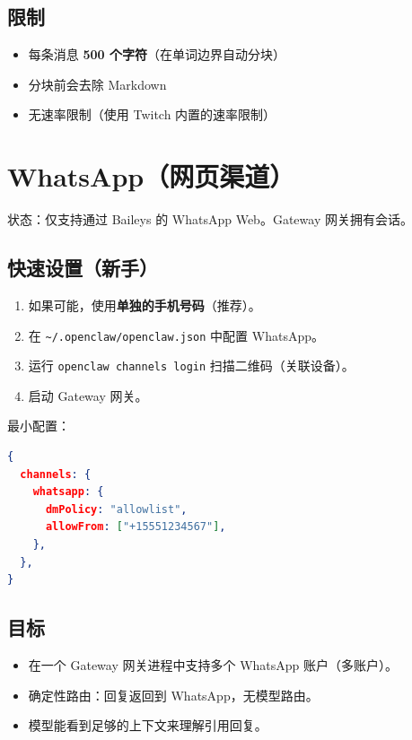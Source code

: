\subsection{限制}


\begin{itemize}
  \item 每条消息 \textbf{500 个字符}（在单词边界自动分块）
  \item 分块前会去除 Markdown
  \item 无速率限制（使用 Twitch 内置的速率限制）
\end{itemize}



\clearpage

\section{WhatsApp（网页渠道）}


状态：仅支持通过 Baileys 的 WhatsApp Web。Gateway 网关拥有会话。

\subsection{快速设置（新手）}


\begin{enumerate}
  \item 如果可能，使用\textbf{单独的手机号码}（推荐）。
  \item 在 \texttt{\textasciitilde{}/.openclaw/openclaw.json} 中配置 WhatsApp。
  \item 运行 \texttt{openclaw channels login} 扫描二维码（关联设备）。
  \item 启动 Gateway 网关。
\end{enumerate}


最小配置：

\begin{lstlisting}[language=json]
{
  channels: {
    whatsapp: {
      dmPolicy: "allowlist",
      allowFrom: ["+15551234567"],
    },
  },
}
\end{lstlisting}


\subsection{目标}


\begin{itemize}
  \item 在一个 Gateway 网关进程中支持多个 WhatsApp 账户（多账户）。
  \item 确定性路由：回复返回到 WhatsApp，无模型路由。
  \item 模型能看到足够的上下文来理解引用回复。
\end{itemize}


